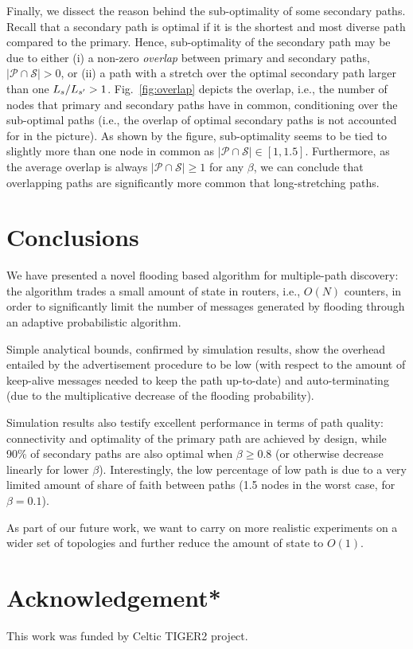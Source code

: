 \documentclass[conference]{IEEEtran}
\newcommand{\PA}{\ensuremath{\mathcal{P}}}
\newcommand{\SE}{\ensuremath{\mathcal{S}}}
\newcommand{\Be}{\ensuremath{\beta}} \newcommand{\ML}{\ensuremath{\kappa}} \newcommand{\PB}{\ensuremath{p_b}}
\begin{document}
Finally, we dissect the reason behind the sub-optimality of some secondary  paths. Recall that a secondary path is optimal if it is the shortest and most diverse path compared to the primary. Hence, sub-optimality of the secondary path may be due to  either (i) a non-zero \emph{overlap} between primary and secondary paths,  $| \PA \cap \SE |>0$,  or (ii) a path with a stretch  over the optimal secondary path  larger than one $L_s/L_{s'} > 1$.  Fig.~\ref{fig:overlap}  depicts the overlap, i.e., the number of nodes that primary and secondary paths have in common, conditioning over the sub-optimal paths (i.e., the overlap of optimal secondary paths is not accounted for in the picture). As shown by the figure,  sub-optimality seems to be tied to slightly more than one node in common as  $|\PA \cap \SE|\in [1,1.5]$. Furthermore, as the average overlap is always $| \PA \cap \SE | \ge 1$ for any \Be, we can conclude that overlapping paths are significantly more common that long-stretching paths. 



 


\section{Conclusions}\label{sec:Future}
We have presented a novel flooding based algorithm for multiple-path discovery: the algorithm trades a small amount of state in routers, i.e., $O(N)$ counters, in order to significantly limit the number of messages generated by flooding through an adaptive probabilistic algorithm. 

Simple analytical bounds, confirmed by simulation results, show the overhead entailed by the advertisement procedure to be low (with respect to the amount of keep-alive messages needed to keep the path up-to-date) and auto-terminating (due to the multiplicative decrease of the flooding probability).

Simulation results also testify excellent performance in terms of path quality:
connectivity and optimality of the primary path are achieved by design, while 90\% of secondary paths are also optimal when $\Be\ge 0.8$ (or otherwise decrease linearly for lower \Be).  Interestingly, the low percentage of low path is due to a very limited amount of share of faith between paths (1.5 nodes in the worst case, for $\Be=0.1$).

As part of our future work, we want to carry on more realistic experiments on a wider set of topologies and further reduce the amount of state to $O(1)$.  


\section{Acknowledgement*}
This work was funded by Celtic TIGER2 project.






\end{document}
